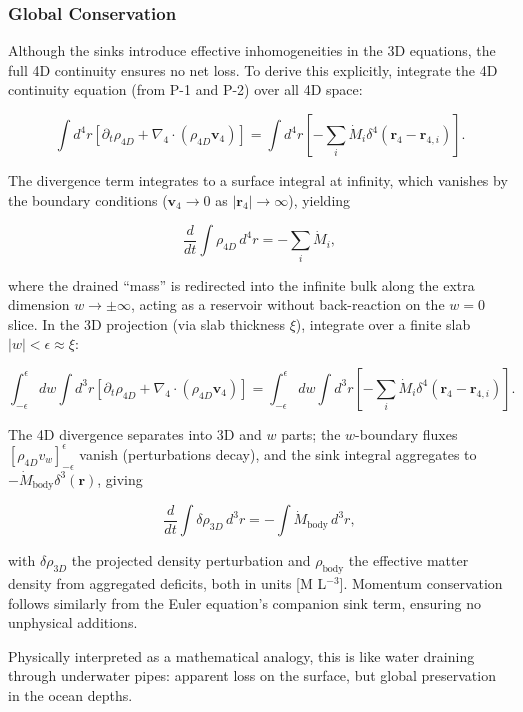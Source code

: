 \subsubsection{Global Conservation}
Although the sinks introduce effective inhomogeneities in the 3D equations, the full 4D continuity ensures no net loss. To derive this explicitly, integrate the 4D continuity equation (from P-1 and P-2) over all 4D space:

\[
\int d^4 r \left[ \partial_t \rho_{4D} + \nabla_4 \cdot (\rho_{4D} \mathbf{v}_4) \right] = \int d^4 r \left[ -\sum_i \dot{M}_i \delta^4(\mathbf{r}_4 - \mathbf{r}_{4,i}) \right].
\]

The divergence term integrates to a surface integral at infinity, which vanishes by the boundary conditions ($\mathbf{v}_4 \to 0$ as $|\mathbf{r}_4| \to \infty$), yielding

\begin{equation}
\frac{d}{dt} \int \rho_{4D} \, d^4 r = -\sum_i \dot{M}_i,
\end{equation}

where the drained ``mass'' is redirected into the infinite bulk along the extra dimension $w \to \pm \infty$, acting as a reservoir without back-reaction on the $w=0$ slice. In the 3D projection (via slab thickness $\xi$), integrate over a finite slab $|w| < \epsilon \approx \xi$:

\[
\int_{-\epsilon}^{\epsilon} dw \int d^3 r \left[ \partial_t \rho_{4D} + \nabla_4 \cdot (\rho_{4D} \mathbf{v}_4) \right] = \int_{-\epsilon}^{\epsilon} dw \int d^3 r \left[ -\sum_i \dot{M}_i \delta^4(\mathbf{r}_4 - \mathbf{r}_{4,i}) \right].
\]

The 4D divergence separates into 3D and $w$ parts; the $w$-boundary fluxes $[\rho_{4D} v_w]_{-\epsilon}^{\epsilon}$ vanish (perturbations decay), and the sink integral aggregates to $-\dot{M}_{\text{body}} \delta^3(\mathbf{r})$, giving

\begin{equation}
\frac{d}{dt} \int \delta \rho_{3D} \, d^3 r = -\int \dot{M}_{\text{body}} \, d^3 r,
\end{equation}

with $\delta \rho_{3D}$ the projected density perturbation and $\rho_{\text{body}}$ the effective matter density from aggregated deficits, both in units [M L$^{-3}$]. Momentum conservation follows similarly from the Euler equation's companion sink term, ensuring no unphysical additions.

Physically interpreted as a mathematical analogy, this is like water draining through underwater pipes: apparent loss on the surface, but global preservation in the ocean depths.

